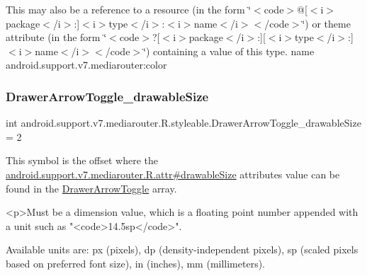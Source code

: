 This may also be a reference to a resource (in the form \char`\"{}$<$code$>$@\mbox{[}$<$i$>$package$<$/i$>$\+:\mbox{]}$<$i$>$type$<$/i$>$\+:$<$i$>$name$<$/i$>$$<$/code$>$\char`\"{}) or theme attribute (in the form \char`\"{}$<$code$>$?\mbox{[}$<$i$>$package$<$/i$>$\+:\mbox{]}\mbox{[}$<$i$>$type$<$/i$>$\+:\mbox{]}$<$i$>$name$<$/i$>$$<$/code$>$\char`\"{}) containing a value of this type.  name android.\+support.\+v7.\+mediarouter\+:color \mbox{\label{classandroid_1_1support_1_1v7_1_1mediarouter_1_1R_1_1styleable_a3312cfca0f8aa8b24370e5800a56eead}} 
\subsubsection{\texorpdfstring{Drawer\+Arrow\+Toggle\+\_\+drawable\+Size}{DrawerArrowToggle\_drawableSize}}
{\footnotesize\ttfamily int android.\+support.\+v7.\+mediarouter.\+R.\+styleable.\+Drawer\+Arrow\+Toggle\+\_\+drawable\+Size = 2\hspace{0.3cm}{\ttfamily [static]}}

This symbol is the offset where the \hyperlink{classandroid_1_1support_1_1v7_1_1mediarouter_1_1R_1_1attr_a757642cadfbbf0eb88e795794f658959}{android.\+support.\+v7.\+mediarouter.\+R.\+attr\#drawable\+Size} attribute\textquotesingle{}s value can be found in the \hyperlink{classandroid_1_1support_1_1v7_1_1mediarouter_1_1R_1_1styleable_a71030bdd9f81aafe32f56767ba04e5b0}{Drawer\+Arrow\+Toggle} array.

\begin{DoxyVerb}      <p>Must be a dimension value, which is a floating point number appended with a unit such as "<code>14.5sp</code>".
\end{DoxyVerb}
 Available units are\+: px (pixels), dp (density-\/independent pixels), sp (scaled pixels based on preferred font size), in (inches), mm (millimeters). 


